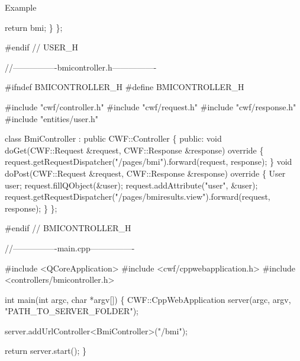 \begin{DoxyParagraph}{Example}
\begin{DoxyCode}
        \textcolor{keywordflow}{return} bmi;
    \}
\};

\textcolor{preprocessor}{#endif // USER\_H}

\textcolor{comment}{//----------------bmicontroller.h----------------}

\textcolor{preprocessor}{#ifndef BMICONTROLLER\_H}
\textcolor{preprocessor}{#define BMICONTROLLER\_H}

\textcolor{preprocessor}{#include "cwf/controller.h"}
\textcolor{preprocessor}{#include "cwf/request.h"}
\textcolor{preprocessor}{#include "cwf/response.h"}
\textcolor{preprocessor}{#include "entities/user.h"}

\textcolor{keyword}{class }BmiController : \textcolor{keyword}{public} CWF::Controller
\{
\textcolor{keyword}{public}:
    \textcolor{keywordtype}{void} doGet(CWF::Request &request, CWF::Response &response)\textcolor{keyword}{ override}
\textcolor{keyword}{    }\{
        request.getRequestDispatcher(\textcolor{stringliteral}{"/pages/bmi"}).forward(request, response);
    \}
    \textcolor{keywordtype}{void} doPost(CWF::Request &request, CWF::Response &response)\textcolor{keyword}{ override}
\textcolor{keyword}{    }\{
        User user;
        request.fillQObject(&user);
        request.addAttribute(\textcolor{stringliteral}{"user"}, &user);
        request.getRequestDispatcher(\textcolor{stringliteral}{"/pages/bmiresults.view"}).forward(request, response);
    \}
\};

\textcolor{preprocessor}{#endif // BMICONTROLLER\_H}

\textcolor{comment}{//----------------main.cpp----------------}

\textcolor{preprocessor}{#include <QCoreApplication>}
\textcolor{preprocessor}{#include <cwf/cppwebapplication.h>}
\textcolor{preprocessor}{#include <controllers/bmicontroller.h>}

\textcolor{keywordtype}{int} main(\textcolor{keywordtype}{int} argc, \textcolor{keywordtype}{char} *argv[])
\{
    CWF::CppWebApplication server(argc, argv, \textcolor{stringliteral}{"PATH\_TO\_SERVER\_FOLDER"});

    server.addUrlController<BmiController>(\textcolor{stringliteral}{"/bmi"});

    \textcolor{keywordflow}{return} server.start();
\}
\end{DoxyCode}
 
\end{DoxyParagraph}
\mbox{\label{class_request_ac593ca2abd88c9e21238a37da8c707f6}} 

